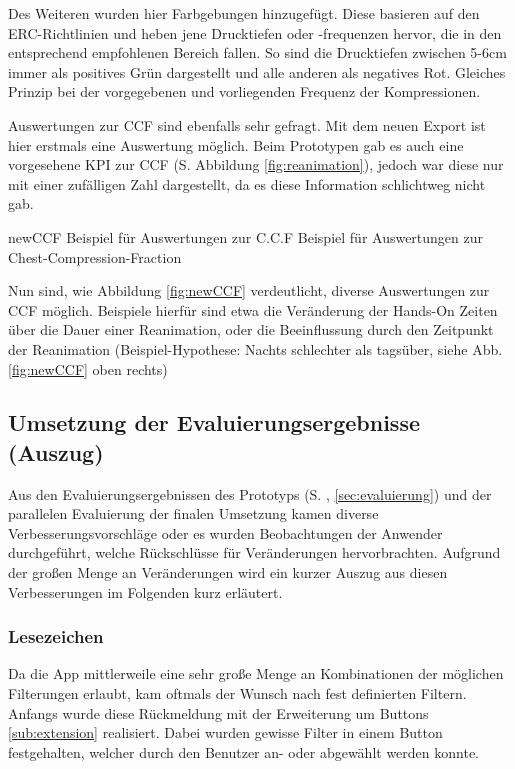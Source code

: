Des Weiteren wurden hier Farbgebungen hinzugefügt.
Diese basieren auf den ERC-Richtlinien \cite{Adams.2016, Monsieurs.2015} und heben jene Drucktiefen oder -frequenzen hervor, die in den entsprechend empfohlenen Bereich fallen.
So sind die Drucktiefen zwischen 5-6cm immer als positives Grün dargestellt und alle anderen als negatives Rot.
Gleiches Prinzip bei der vorgegebenen und vorliegenden Frequenz der Kompressionen.

Auswertungen zur \gls{CCF} sind ebenfalls sehr gefragt.
Mit dem neuen Export ist hier erstmals eine Auswertung möglich. 
Beim Prototypen gab es auch eine vorgesehene \gls{KPI} zur CCF (S.\pageref{fig:reanimation} Abbildung \ref{fig:reanimation}), jedoch war diese nur mit einer zufälligen Zahl dargestellt, da es diese Information schlichtweg nicht gab.

\bildbreit
{newCCF}
{Beispiel für Auswertungen zur \gls{C.C.F}}
{Beispiel für Auswertungen zur Chest-Compression-Fraction}

Nun sind, wie Abbildung \ref{fig:newCCF} verdeutlicht, diverse Auswertungen zur CCF möglich.
Beispiele hierfür sind etwa die Veränderung der Hands-On Zeiten über die Dauer einer Reanimation, oder die Beeinflussung durch den Zeitpunkt der Reanimation (Beispiel-Hypothese: Nachts schlechter als tagsüber, siehe Abb. \ref{fig:newCCF} oben rechts)

\subsection{Umsetzung der Evaluierungsergebnisse (Auszug)}
Aus den Evaluierungsergebnissen des Prototyps (S. \pageref{sec:evaluierung}, \ref{sec:evaluierung}) und der parallelen Evaluierung der finalen Umsetzung kamen diverse Verbesserungsvorschläge oder es wurden Beobachtungen der Anwender durchgeführt, welche Rückschlüsse für Veränderungen hervorbrachten.
Aufgrund der großen Menge an Veränderungen wird ein kurzer Auszug aus diesen Verbesserungen im Folgenden kurz erläutert.

\subsubsection{Lesezeichen} %
\label{subsub:lesezeichen}
Da die App mittlerweile eine sehr große Menge an Kombinationen der möglichen Filterungen erlaubt, kam oftmals der Wunsch nach fest definierten Filtern.
Anfangs wurde diese Rückmeldung mit der Erweiterung um Buttons \ref{sub:extension} realisiert.
Dabei wurden gewisse Filter in einem Button festgehalten, welcher durch den Benutzer an- oder abgewählt werden konnte.

